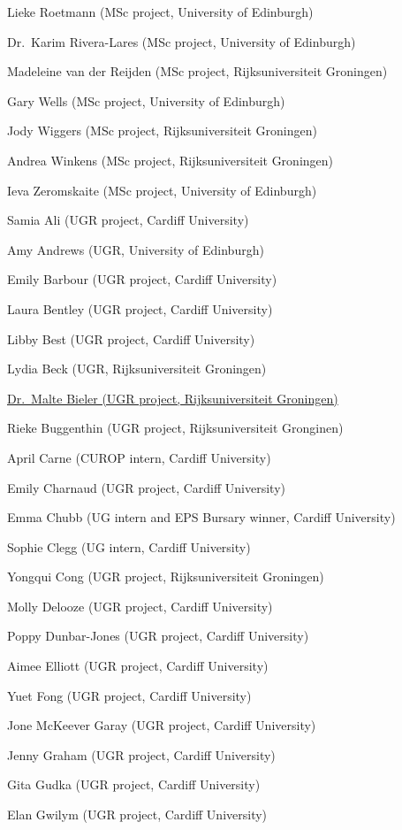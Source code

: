 \documentclass[
  12pt,
]{book}
\begin{document}
Lieke Roetmann (MSc project, University of Edinburgh)

Dr.~Karim Rivera-Lares (MSc project, University of Edinburgh)

Madeleine van der Reijden (MSc project, Rijksuniversiteit Groningen)

Gary Wells (MSc project, University of Edinburgh)

Jody Wiggers (MSc project, Rijksuniversiteit Groningen)

Andrea Winkens (MSc project, Rijksuniversiteit Groningen)

Ieva Zeromskaite (MSc project, University of Edinburgh)

Samia Ali (UGR project, Cardiff University)

Amy Andrews (UGR, University of Edinburgh)

Emily Barbour (UGR project, Cardiff University)

Laura Bentley (UGR project, Cardiff University)

Libby Best (UGR project, Cardiff University)

Lydia Beck (UGR, Rijksuniversiteit Groningen)

\href{https://www.linkedin.com/in/maltebieler/}{Dr.~Malte Bieler (UGR project, Rijksuniversiteit Groningen)}

Rieke Buggenthin (UGR project, Rijksuniversiteit Gronginen)

April Carne (CUROP intern, Cardiff University)

Emily Charnaud (UGR project, Cardiff University)

Emma Chubb (UG intern and EPS Bursary winner, Cardiff University)

Sophie Clegg (UG intern, Cardiff University)

Yongqui Cong (UGR project, Rijksuniversiteit Groningen)

Molly Delooze (UGR project, Cardiff University)

Poppy Dunbar-Jones (UGR project, Cardiff University)

Aimee Elliott (UGR project, Cardiff University)

Yuet Fong (UGR project, Cardiff University)

Jone McKeever Garay (UGR project, Cardiff University)

Jenny Graham (UGR project, Cardiff University)

Gita Gudka (UGR project, Cardiff University)

Elan Gwilym (UGR project, Cardiff University)
\end{document}

